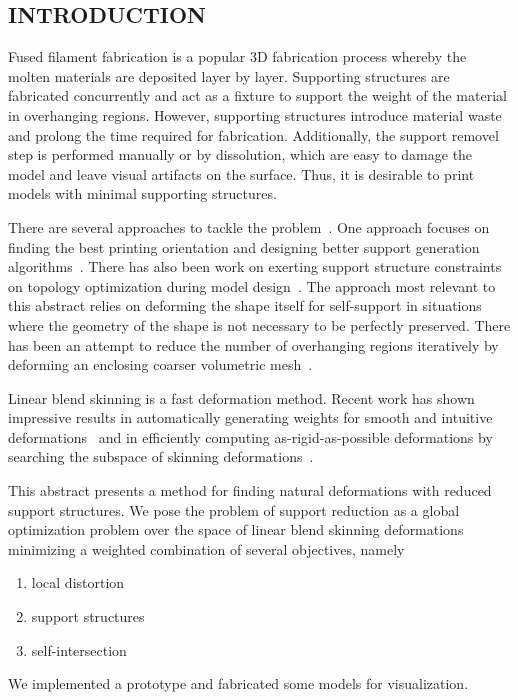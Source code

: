 
\subsection*{INTRODUCTION}

Fused filament fabrication is a popular 3D fabrication process whereby the molten materials are deposited layer by layer. Supporting structures are fabricated concurrently and act as a fixture to support the weight of the material in overhanging regions. However, supporting structures introduce material waste and prolong the time required for fabrication. Additionally, the support removel step is performed manually or by dissolution, which are easy to damage the model and leave visual artifacts on the surface. Thus, it is desirable to print models with minimal supporting structures.

There are several approaches to tackle the problem~\cite{jiang_xu_stringer_2018}. One approach focuses on finding the best printing orientation and designing better support generation algorithms~\cite{vanek_galicia_benes_2014}. There has also been work on exerting support structure constraints on topology optimization during model design~\cite{langelaar_2016}. The approach most relevant to this abstract relies on deforming the shape itself for self-support in situations where the geometry of the shape is not necessary to be perfectly preserved. There has been an attempt to reduce the number of overhanging regions iteratively by deforming an enclosing coarser volumetric mesh~\cite{hu_jin_wang_2015}.

Linear blend skinning is a fast deformation method. Recent work has shown impressive results in automatically generating weights for smooth and intuitive deformations~\cite{jacobson_bounded_biharmonic_weights_2011} and in efficiently computing as-rigid-as-possible deformations by searching the subspace of skinning deformations~\cite{jacobson_fast_2012}.

This abstract presents a method for finding natural deformations with reduced support structures. We pose the problem of support reduction as a global optimization problem over the space of linear blend skinning deformations minimizing a weighted combination of several objectives, namely
\begin{enumerate}
    \item local distortion ~\cite{sorkine_arap_2007}
    \item support structures
    \item self-intersection
\end{enumerate}
We implemented a prototype and fabricated some models for visualization.

